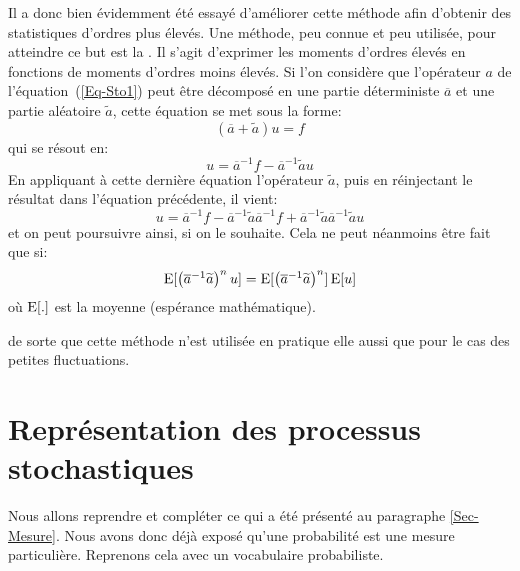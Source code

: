 \begin{histoire}
\medskip
Il a donc bien évidemment été essayé d'améliorer cette méthode afin d'obtenir des statistiques d'ordres plus élevés. Une méthode, peu connue et peu utilisée, pour atteindre ce but est la . Il s'agit d'exprimer les moments d'ordres élevés en fonctions de moments d'ordres moins élevés.
Si l'on considère que l'opérateur $a$ de l'équation~(\ref{Eq-Sto1}) peut être décomposé en une partie déterministe $\overline{a}$ et une partie aléatoire $\widetilde{a}$, cette équation se met sous la forme:
\begin{equation}
(\overline{a}+\widetilde{a})u=f
\end{equation}
qui se résout en:
\begin{equation}
u=\overline{a}^{-1}f-\overline{a}^{-1}\widetilde{a}u
\end{equation}
En appliquant à cette dernière équation l'opérateur $\widetilde{a}$, puis en réinjectant le résultat dans l'équation précédente, il vient:
\begin{equation}
u=\overline{a}^{-1}f-\overline{a}^{-1}\widetilde{a}\overline{a}^{-1}f+\overline{a}^{-1}\widetilde{a}\overline{a}^{-1}\widetilde{a}u
\end{equation}
et on peut poursuivre ainsi, si on le souhaite. Cela ne peut néanmoins être fait que si:
\begin{equation}\label{Eq-Unco}
\operatorname{E}[\begin{pmatrix}\overline{a}^{-1}\widetilde{a}\end{pmatrix}^nu] = \operatorname{E}[\begin{pmatrix}\overline{a}^{-1}\widetilde{a}\end{pmatrix}^n]\operatorname{E}[u]
\end{equation}
où $\operatorname{E}[.]$ est la moyenne (espérance mathématique). 

  de sorte que cette méthode n'est utilisée en pratique elle aussi que pour le cas des petites fluctuations.
\end{histoire}

\medskip
\section{Représentation des processus stochastiques}

Nous allons reprendre et compléter ce qui a été présenté au paragraphe \ref{Sec-Mesure}.
Nous avons donc déjà exposé qu'une probabilité est une mesure particulière.
Reprenons cela avec un vocabulaire probabiliste.

